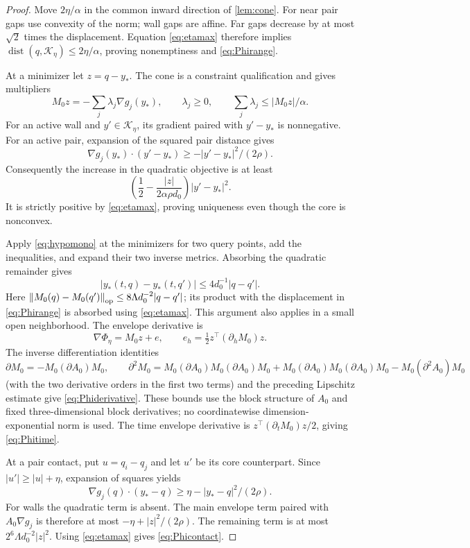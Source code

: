 \documentclass[11pt]{article}
\numberwithin{equation}{section}
\theoremstyle{definition}
\theoremstyle{remark}\newtheorem{remark}[theorem]{Remark}
\newcommand{\dist}{\operatorname{dist}}
\newcommand{\K}{\mathcal K}
\newcommand{\norm}[1]{\left\|#1\right\|}
\begin{document}
\begin{proof}
Move $2\eta/\alpha$ in the common inward direction of
\cref{lem:cone}. For near pair gaps use convexity of the norm; wall gaps
are affine. Far gaps decrease by at most $\sqrt2$ times the displacement.
Equation \eqref{eq:etamax} therefore implies
$\dist(q,\K_\eta)\le2\eta/\alpha$, proving nonemptiness and
\eqref{eq:Phirange}.

At a minimizer let $z=q-y_*$. The cone is a constraint qualification and
gives multipliers
\begin{equation}\label{eq:projectionmultiplier}
 M_0z=-\sum_j\lambda_j\nabla g_j(y_*),\qquad
 \lambda_j\ge0,\qquad\sum_j\lambda_j\le |M_0z|/\alpha.
\end{equation}
For an active wall and $y'\in\K_\eta$, its gradient paired with
$y'-y_*$ is nonnegative. For an active pair, expansion of the squared
pair distance gives
\begin{equation}\label{eq:hypomono}
 \nabla g_j(y_*)\cdot(y'-y_*)\ge
                      -|y'-y_*|^2/(2\rho).
\end{equation}
Consequently the increase in the quadratic objective is at least
\[
 \left(\frac12-\frac{|z|}{2\alpha\rho d_0}\right)|y'-y_*|^2.
\]
It is strictly positive by \eqref{eq:etamax}, proving uniqueness even
though the core is nonconvex.

Apply \eqref{eq:hypomono} at the minimizers for two query points, add
the inequalities, and expand their two inverse metrics. Absorbing the
quadratic remainder gives
\[
 |y_*(t,q)-y_*(t,q')|\le4d_0^{-1}|q-q'|.
\]
Here $\norm{M_0(q)-M_0(q')}_{\rm op}
\le 8\Lambda d_0^{-2}|q-q'|$; its product with the displacement in
\eqref{eq:Phirange} is absorbed using \eqref{eq:etamax}. This argument
also applies in a small open neighborhood. The envelope derivative is
\[
 \nabla\Phi_\eta=M_0z+e,\qquad
 e_h=\tfrac12z^\top(\partial_hM_0)z.
\]
The inverse differentiation identities
\[
 \partial M_0=-M_0(\partial A_0)M_0,\qquad
 \partial^2M_0=M_0(\partial A_0)M_0(\partial A_0)M_0
   +M_0(\partial A_0)M_0(\partial A_0)M_0-M_0(\partial^2A_0)M_0
\]
(with the two derivative orders in the first two terms) and the preceding
Lipschitz estimate give \eqref{eq:Phiderivative}. These bounds use the
block structure of $A_0$ and fixed three-dimensional block derivatives;
no coordinatewise dimension-exponential norm is used. The time envelope
derivative is $z^\top(\partial_tM_0)z/2$, giving \eqref{eq:Phitime}.

At a pair contact, put $u=q_i-q_j$ and let $u'$ be its core counterpart.
Since $|u'|\ge |u|+\eta$, expansion of squares yields
\[
 \nabla g_j(q)\cdot(y_*-q)
     \ge\eta-|y_*-q|^2/(2\rho).
\]
For walls the quadratic term is absent. The main envelope term paired
with $A_0\nabla g_j$ is therefore at most $-\eta+|z|^2/(2\rho)$.
The remaining term is at most $2^6\Lambda d_0^{-2}|z|^2$.
Using \eqref{eq:etamax} gives \eqref{eq:Phicontact}.
\end{proof}
\end{document}
